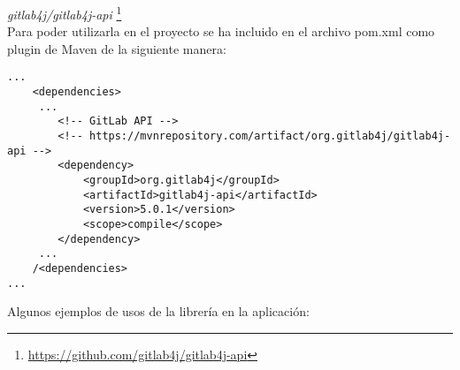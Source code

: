 \textit{gitlab4j/gitlab4j-api} \footnote{\url{https://github.com/gitlab4j/gitlab4j-api}}\\

Para poder utilizarla en el proyecto se ha incluido en el archivo pom.xml como plugin de Maven de la siguiente manera:\\

\begin{minipage}{\linewidth}
{\tiny
\begin{verbatim}
...
	<dependencies>
	 ...
		<!-- GitLab API -->
		<!-- https://mvnrepository.com/artifact/org.gitlab4j/gitlab4j-api -->
		<dependency>
			<groupId>org.gitlab4j</groupId>
			<artifactId>gitlab4j-api</artifactId>
			<version>5.0.1</version>
			<scope>compile</scope>
		</dependency>
	 ...
	/<dependencies>
...
\end{verbatim}
}
\end{minipage}

\newpage

Algunos ejemplos de usos de la librería en la aplicación:\\

